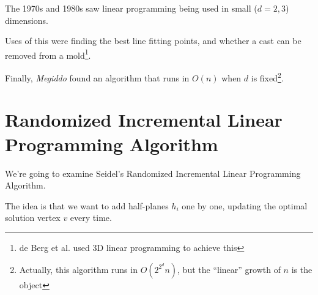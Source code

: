                     The 1970s and 1980s saw linear programming being used in small ($d=2, 3$) dimensions.

                    Uses of this were finding the best line fitting points, and whether a cast can be removed from a mold\footnote{de Berg et al. used 3D linear programming to achieve this}.

                    Finally, \textit{Megiddo} found an algorithm that runs in $O(n)$ when $d$ is fixed\footnote{Actually, this algorithm runs in $O(2^{2^d} n)$, but the ``linear'' growth of $n$ is the object}.
            \section{Randomized Incremental Linear Programming Algorithm} %
            \label{sec:randomized_incremental_linear_programming_algorithm}
                We're going to examine Seidel's Randomized Incremental Linear Programming Algorithm.

                The idea is that we want to add half-planes $h_i$ one by one, updating the optimal solution vertex $v$ every time.

